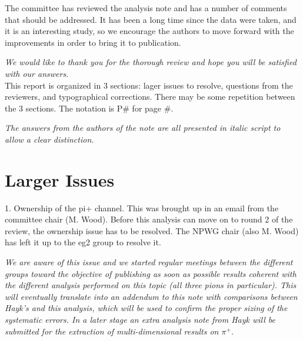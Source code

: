 \documentclass[12pt]{article}
\begin{document}
\pagestyle{plain}
\setcounter{page}{2}

The committee has reviewed the analysis note and has a number of comments that should be 
addressed.  It has been a long time since the data were taken, and it is an interesting study, so 
we encourage the authors to move forward with the improvements in order to bring it to 
publication.

{\it We would like to thank you for the thorough review and hope you will be satisfied with
our answers.} \\

This report is organized in 3 sections: lager issues to resolve, questions from the reviewers, and 
typographical corrections.  There may be some repetition between the 3 sections.  The notation 
is P\# for page \#.

{\it The answers from the authors of the note are all presented in italic script 
to allow a clear distinction.} \\

\section{Larger Issues }
1.
Ownership of the pi+ channel.  This was brought up in an email from the committee chair 
(M. Wood).  Before this analysis can move on to round 2 of the review, the ownership issue 
has to be resolved.  The NPWG chair (also M. Wood) has left it up to the eg2 group to 
resolve it.

{\it We are aware of this issue and we started regular meetings between the different 
groups toward the objective of publishing as soon as possible results coherent with
the different analysis performed on this topic (all three pions in particular). This
will eventually translate into an addendum to this note with comparisons between Hayk's 
and this analysis, which will be used to confirm the proper sizing of the systematic errors. 
In a later stage an extra analysis note from Hayk will be submitted
for the extraction of multi-dimensional results on $\pi^+$.} \\
\end{document}
